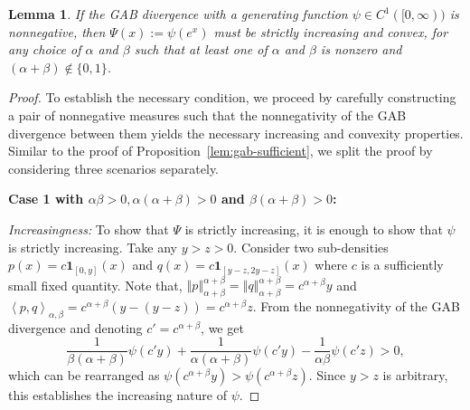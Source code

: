 \documentclass[11pt]{article}
\theoremstyle{plain}
\newtheorem{lemma}[theorem]{Lemma}
\theoremstyle{remark}
\newcommand{\ind}[1]{\boldsymbol{1}_{#1} }
\newcommand{\norm}[1]{\left\Vert #1 \right\Vert}
\newcommand{\inner}[1]{\left\langle #1\right\rangle}
\begin{document}
\begin{lemma}\label{lem:gab-necessary}
    If the GAB divergence with a generating function $\psi \in C^1([0, \infty))$ is nonnegative, then $\Psi(x) := \psi(e^x)$ must be strictly increasing and convex, for any choice of $\alpha$ and $\beta$ such that
    at least one of $\alpha$ and $\beta$ is nonzero and $(\alpha + \beta) \notin \{0, 1\}$.
\end{lemma}

\begin{proof}
    To establish the necessary condition, we proceed by carefully constructing a pair of nonnegative measures such that the nonnegativity of the GAB divergence between them yields the necessary increasing and convexity properties. Similar to the proof of Proposition~\ref{lem:gab-sufficient}, we split the proof by considering three scenarios separately.

    \noindent\textbf{Case 1 with $\alpha\beta > 0, \alpha(\alpha+\beta) > 0$ and $\beta(\alpha + \beta) > 0$:}

    \noindent\emph{Increasingness:} To show that $\Psi$ is strictly increasing, it is enough to show that $\psi$ is strictly increasing. Take any $y > z > 0$. Consider two sub-densities $p(x) = c\ind{[0, y]}(x)$ and $q(x) = c\ind{[y-z, 2y-z]}(x)$ where $c$ is a sufficiently small fixed quantity. Note that, $\norm{p}_{\alpha+\beta}^{\alpha+\beta} = \norm{q}_{\alpha+\beta}^{\alpha+\beta} = c^{\alpha+\beta} y$ and $\inner{p,q}_{\alpha,\beta} = c^{\alpha+\beta}(y-(y-z)) = c^{\alpha+\beta} z$. From the nonnegativity of the GAB divergence and denoting $c' = c^{\alpha+\beta}$, we get
    \begin{equation*}
        \dfrac{1}{\beta(\alpha+\beta)} \psi(c' y) + \dfrac{1}{\alpha(\alpha+\beta)}\psi(c' y) - \dfrac{1}{\alpha\beta}\psi(c' z) > 0,
    \end{equation*}
    \noindent which can be rearranged as $\psi(c^{\alpha+\beta} y) > \psi(c^{\alpha+\beta} z)$. Since $y > z$ is arbitrary, this establishes the increasing nature of $\psi$.


\end{proof}
\end{document}
